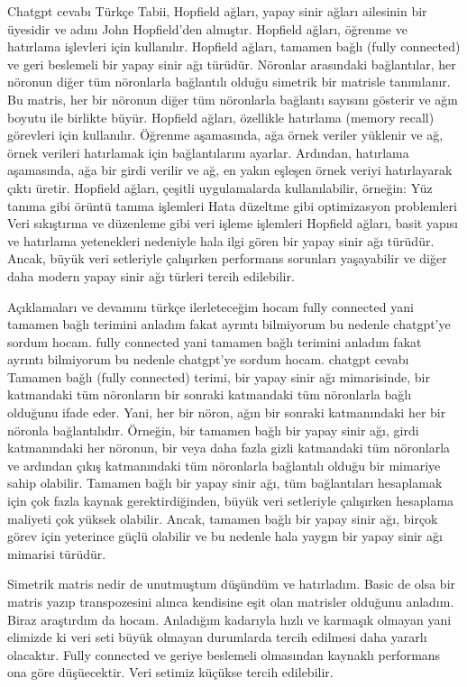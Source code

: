 \documentclass[11pt]{article}
\begin{document}
Chatgpt cevabı Türkçe
Tabii, Hopfield ağları, yapay sinir ağları ailesinin bir üyesidir ve adını John Hopfield'den almıştır. Hopfield ağları, öğrenme ve hatırlama işlevleri için kullanılır.
Hopfield ağları, tamamen bağlı (fully connected) ve geri beslemeli bir yapay sinir ağı türüdür. Nöronlar arasındaki bağlantılar, her nöronun diğer tüm nöronlarla bağlantılı olduğu simetrik bir matrisle tanımlanır. Bu matris, her bir nöronun diğer tüm nöronlarla bağlantı sayısını gösterir ve ağın boyutu ile birlikte büyür.
Hopfield ağları, özellikle hatırlama (memory recall) görevleri için kullanılır. Öğrenme aşamasında, ağa örnek veriler yüklenir ve ağ, örnek verileri hatırlamak için bağlantılarını ayarlar. Ardından, hatırlama aşamasında, ağa bir girdi verilir ve ağ, en yakın eşleşen örnek veriyi hatırlayarak çıktı üretir.
Hopfield ağları, çeşitli uygulamalarda kullanılabilir, örneğin:
Yüz tanıma gibi örüntü tanıma işlemleri
Hata düzeltme gibi optimizasyon problemleri Veri sıkıştırma ve düzenleme gibi veri işleme işlemleri
Hopfield ağları, basit yapısı ve hatırlama yetenekleri nedeniyle hala ilgi gören bir yapay sinir ağı türüdür. Ancak, büyük veri setleriyle çalışırken performans sorunları yaşayabilir ve diğer daha modern yapay sinir ağı türleri tercih edilebilir.

Açıklamaları ve devamını türkçe ilerleteceğim hocam
fully connected yani tamamen bağlı terimini anladım fakat ayrıntı bilmiyorum bu nedenle chatgpt'ye sordum hocam.
fully connected yani tamamen bağlı terimini anladım fakat ayrıntı bilmiyorum bu nedenle chatgpt'ye sordum hocam.
chatgpt cevabı
Tamamen bağlı (fully connected) terimi, bir yapay sinir ağı mimarisinde, bir katmandaki tüm nöronların bir sonraki katmandaki tüm nöronlarla bağlı olduğunu ifade eder. Yani, her bir nöron, ağın bir sonraki katmanındaki her bir nöronla bağlantılıdır.
Örneğin, bir tamamen bağlı bir yapay sinir ağı, girdi katmanındaki her nöronun, bir veya daha fazla gizli katmandaki tüm nöronlarla ve ardından çıkış katmanındaki tüm nöronlarla bağlantılı olduğu bir mimariye sahip olabilir.
Tamamen bağlı bir yapay sinir ağı, tüm bağlantıları hesaplamak için çok fazla kaynak gerektirdiğinden, büyük veri setleriyle çalışırken hesaplama maliyeti çok yüksek olabilir. Ancak, tamamen bağlı bir yapay sinir ağı, birçok görev için yeterince güçlü olabilir ve bu nedenle hala yaygın bir yapay sinir ağı mimarisi türüdür.

Simetrik matris nedir de unutmuştum düşündüm ve hatırladım. Basic de olsa bir matris yazıp transpozesini alınca kendisine eşit olan matrisler olduğunu anladım. Biraz araştırdım da hocam.
Anladığım kadarıyla hızlı ve karmaşık olmayan yani elimizde ki veri seti büyük olmayan durumlarda tercih edilmesi daha yararlı olacaktır. Fully connected ve geriye beslemeli olmasından kaynaklı performans ona göre düşüecektir. Veri setimiz küçükse tercih edilebilir.
\end{document}
